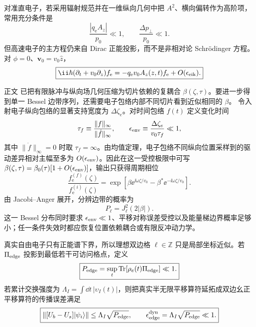 \begin{exbox}
对准直电子，若采用辐射规范并在一维纵向几何中把 $A^2$、横向偏转作为高阶项，常用充分条件是
\begin{equation}
\boxed{
\frac{|q_{\mathrm e} A_z|}{p_0}\ll1,
\qquad
\frac{\Delta p_\perp}{p_0}\ll1.}
\label{eq:pinem_ap_small_parameters}
\end{equation}
但高速电子的主方程仍来自 Dirac 正能投影，而不是非相对论 Schr\"odinger 方程。对 $\phi=0$、$\mathbf v_0=v_0\hat z$，
\begin{equation}
\boxed{
\ii\hbar(\partial_t+v_0\partial_z)f_{\mathrm e}
=-q_{\mathrm e} v_0A_z(z,t)f_{\mathrm e}+O(\epsilon_{\rm eik}).}
\label{eq:dirac_projected_pinem_envelope}
\end{equation}

正文 已把有限脉冲与纵向场几何压缩为切片依赖的复耦合 $\beta(\zeta,\tau)$。要进一步得到单一 Bessel 边带序列，还需要电子包络内部不同切片看到近似相同的 $\beta$。
令入射电子纵向包络的显著支持宽度为 $\Delta\zeta_e$。对时间包络 $f(t)$ 定义变化时间
\begin{equation*}
 \tau_f\equiv\frac{\|f\|_\infty}{\|\dot f\|_\infty},
 \qquad
 \epsilon_{\rm env}\equiv\frac{\Delta\zeta_e}{v_0\tau_f}\ll1,
\end{equation*}
其中 $\|\dot f\|_\infty=0$ 时取 $\tau_f=\infty$。由均值定理，电子包络不同纵向位置采样到的驱动差异相对主幅至多为 $O(\epsilon_{\rm env})$。因此在这一受控极限中可写 $\beta(\zeta,\tau)=\beta_0(\tau)[1+O(\epsilon_{\rm env})]$，输出只获得周期相位
\begin{equation*}
\frac{f_{\mathrm e}^{(f)}(\zeta)}{f_{\mathrm e}^{(i)}(\zeta)}
=\exp[\beta \ee^{\ii\omega\zeta/v_0}-\beta^*\ee^{-\ii\omega\zeta/v_0}].
\end{equation*}
由 Jacobi--Anger 展开，分辨边带的概率为
\begin{equation*}
P_\ell=J_\ell^2(2|\beta|).
\end{equation*}
这一 Bessel 分布同时要求 $\epsilon_{\rm env}\ll1$、平移对称误差受控以及能量梯边界概率足够小；任一条件失效时都应恢复位置依赖耦合或有限反冲动力学。
\end{exbox}


真实自由电子只有正能谱下界，所以理想双边格 $\ell\in\mathbb Z$ 只是局部坐标近似。若 $\Pi_{\rm edge}$ 投影到最低若干可访问格点，定义
\begin{equation}
\boxed{
P_{\rm edge}
=\sup_t\operatorname{Tr}[\rho_e(t)\Pi_{\rm edge}]\ll1.}
\label{eq:bilateral_ladder_edge_condition}
\end{equation}
若累计交换强度为 $\Lambda_I=\int\dd t\,|\upsilon_I(t)|$，则把真实半无限平移算符延拓成双边幺正平移算符的传播误差满足
\begin{equation}
\boxed{
\|[U_b-U_s]|\psi_i\rangle\|
\le\Lambda_I\sqrt{P_{\rm edge}},
\qquad
\epsilon_{\rm edge}^{\rm dyn}=\Lambda_I\sqrt{P_{\rm edge}}\ll1.}
\label{eq:bilateral_ladder_dynamical_error}
\end{equation}

